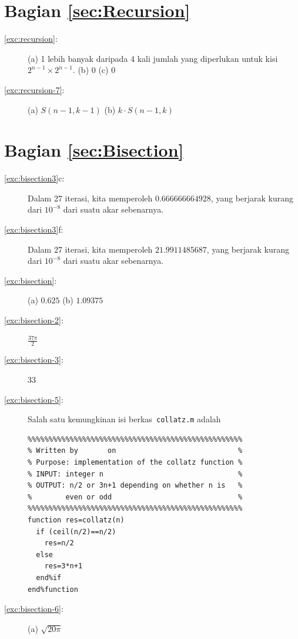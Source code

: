 \section*{Bagian \ref{sec:Recursion}}
\begin{description}
\item [{\ref{exc:recursion}:}] (a) 1 lebih banyak daripada 4 kali jumlah
yang diperlukan untuk kisi $2^{n-1}\times2^{n-1}$. (b) 0 (c) 0
\item [{\ref{exc:recursion-7}:}] (a) $S(n-1,k-1)$ (b) $k\cdot S(n-1,k)$
\end{description}

\section*{Bagian \ref{sec:Bisection}}
\begin{description}
\item [{\ref{exc:bisection3}c:}] Dalam 27 iterasi, kita memperoleh $0.666666664928$,
yang berjarak kurang dari $10^{-8}$ dari suatu akar sebenarnya.
\item [{\ref{exc:bisection3}f:}] Dalam 27 iterasi, kita memperoleh $21.9911485687$,
yang berjarak kurang dari $10^{-8}$ dari suatu akar sebenarnya.
\item [{\ref{exc:bisection}:}] (a) $0.625$ (b) $1.09375$
\item [{\ref{exc:bisection-2}:}] $\frac{37\pi}{2}$
\item [{\ref{exc:bisection-3}:}] 33
\item [{\ref{exc:bisection-5}:}] Salah satu kemungkinan isi berkas\texttt{
collatz.m} adalah \begin{verbatim}
%%%%%%%%%%%%%%%%%%%%%%%%%%%%%%%%%%%%%%%%%%%%%%%%%%%
% Written by       on                             %
% Purpose: implementation of the collatz function %
% INPUT: integer n                                %
% OUTPUT: n/2 or 3n+1 depending on whether n is   %
%        even or odd                              %
%%%%%%%%%%%%%%%%%%%%%%%%%%%%%%%%%%%%%%%%%%%%%%%%%%%
function res=collatz(n)
  if (ceil(n/2)==n/2)
    res=n/2
  else
    res=3*n+1
  end%if
end%function
\end{verbatim}
\item [{\ref{exc:bisection-6}:}] (a) $\sqrt{20\pi}$
\end{description}


